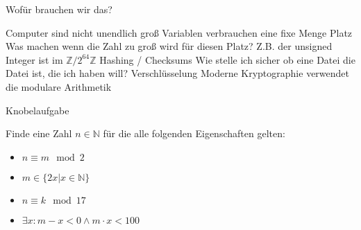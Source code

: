 \begin{frame}{Wofür brauchen wir das?}
    \begin{outline}
        \1 Computer sind nicht unendlich groß
        \2 Variablen verbrauchen eine fixe Menge Platz
        \2 Was machen wenn die Zahl zu groß wird für diesen Platz?
        \2 Z.B. der unsigned Integer ist im $\mathbb Z / 2^{64}\mathbb Z$
        \pause
        \1 Hashing / Checksums
        \2 Wie stelle ich sicher ob eine Datei die Datei ist, die ich haben will?
        \pause
        \1 Verschlüsselung
        \2 Moderne Kryptographie verwendet die modulare Arithmetik

    \end{outline}
\end{frame}

{
\begin{frame}[fragile]{Knobelaufgabe}
    \footnotesize
    \begin{block}{Finde eine Zahl $n \in \mathbb N$ für die alle folgenden Eigenschaften gelten:}
        \begin{multicols}{2}
            \begin{itemize}
                \item $n \equiv m \mod 2$
                \item $m \in \{2x | x \in \mathbb N\}$
                \item $n \equiv k \mod 17$
                \item  $\exists x: m-x < 0 \wedge m\cdot x < 100$
            \end{itemize}
        \end{multicols}
    \end{block}

\end{frame}

}